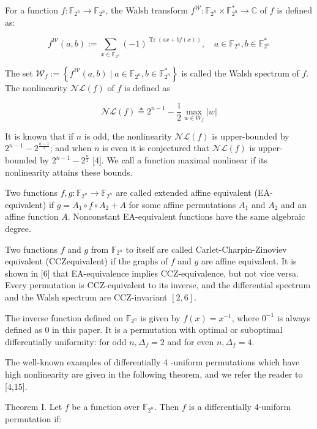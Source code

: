 \documentclass[10pt]{article}
\begin{document}
For a function $f: \mathbb{F}_{2^{n}} \rightarrow \mathbb{F}_{2^{n}}$, the Walsh transform $f^{\mathcal{W}}: \mathbb{F}_{2^{n}} \times \mathbb{F}_{2^{n}}^{*} \rightarrow \mathbb{C}$ of $f$ is defined as:

$$
f^{\mathcal{W}}(a, b):=\sum_{x \in \mathbb{F}_{2^{n}}}(-1)^{\operatorname{Tr}(a x+b f(x))}, \quad a \in \mathbb{F}_{2^{n}}, b \in \mathbb{F}_{2^{n}}^{*}
$$

The set $\mathcal{W}_{f}:=\left\{f^{\mathcal{W}}(a, b) \mid a \in \mathbb{F}_{2^{n}}, b \in \mathbb{F}_{2^{n}}^{*}\right\}$ is called the Walsh spectrum of $f$. The nonlinearity $\mathcal{N} \mathcal{L}(f)$ of $f$ is defined as

$$
\mathcal{N} \mathcal{L}(f) \triangleq 2^{n-1}-\frac{1}{2} \max _{w \in W_{f}}|w|
$$

It is known that if $n$ is odd, the nonlinearity $\mathcal{N} \mathcal{L}(f)$ is upper-bounded by $2^{n-1}-2^{\frac{n-1}{2}}$; and when $n$ is even it is conjectured that $\mathcal{N} \mathcal{L}(f)$ is upper-bounded by $2^{n-1}-2^{\frac{n}{2}}$ [4]. We call a function maximal nonlinear if its nonlinearity attains these bounds.

Two functions $f, g: \mathbb{F}_{2^{n}} \rightarrow \mathbb{F}_{2^{n}}$ are called extended affine equivalent (EA-equivalent) if $g=A_{1} \circ f \circ A_{2}+A$ for some affine permutations $A_{1}$ and $A_{2}$ and an affine function $A$. Nonconstant EA-equivalent functions have the same algebraic degree.

Two functions $f$ and $g$ from $\mathbb{F}_{2^{n}}$ to itself are called Carlet-Charpin-Zinoviev equivalent (CCZequivalent) if the graphs of $f$ and $g$ are affine equivalent. It is shown in [6] that EA-equivalence implies CCZ-equivalence, but not vice versa. Every permutation is CCZ-equivalent to its inverse, and the differential spectrum and the Walsh spectrum are CCZ-invariant $[2,6]$.

The inverse function defined on $\mathbb{F}_{2^{n}}$ is given by $f(x)=x^{-1}$, where $0^{-1}$ is always defined as 0 in this paper. It is a permutation with optimal or suboptimal differentially uniformity: for odd $n, \Delta_{f}=2$ and for even $n, \Delta_{f}=4$.

The well-known examples of differentially 4 -uniform permutations which have high nonlinearity are given in the following theorem, and we refer the reader to [4,15].

Theorem I. Let $f$ be a function over $\mathbb{F}_{2^{n}}$. Then $f$ is a differentially 4-uniform permutation if:
\end{document}
